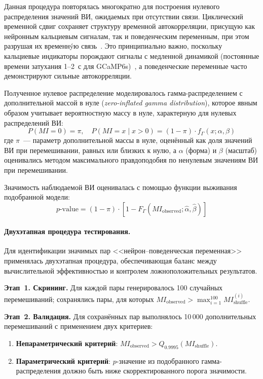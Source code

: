 Данная процедура повторялась многократно для построения нулевого распределения значений ВИ, ожидаемых при отсутствии связи. Циклический временной сдвиг сохраняет структуру временной автокорреляции, присущую как нейронным кальциевым сигналам, так и поведенческим переменным, при этом разрушая их временнýю связь~\cite{Lancaster2018}. Это принципиально важно, поскольку кальциевые индикаторы порождают сигналы с медленной динамикой (постоянные времени затухания 1--2~с для GCaMP6s)~\cite{Chen2013}, а поведенческие переменные часто демонстрируют сильные автокорреляции.

Полученное нулевое распределение моделировалось гамма-распределением с дополнительной массой в нуле (\textit{zero-inflated gamma distribution}), которое явным образом учитывает вероятностную массу в нуле, характерную для нулевых распределений ВИ:
$$P(MI = 0) = \pi, \quad P(MI = x \mid x > 0) = (1 - \pi) \cdot f_\Gamma(x; \alpha, \beta)$$
где $\pi$~--- параметр дополнительной массы в нуле, оценённый как доля значений ВИ при перемешивании, равных или близких к нулю, а $\alpha$ (форма) и $\beta$ (масштаб) оценивались методом максимального правдоподобия по ненулевым значениям ВИ при перемешивании.

Значимость наблюдаемой ВИ оценивалась с помощью функции выживания подобранной модели:
$$p\text{-value} = (1 - \pi) \cdot [1 - F_\Gamma(MI_{\text{observed}}; \hat{\alpha}, \hat{\beta})]$$

\paragraph{Двухэтапная процедура тестирования.}

Для идентификации значимых пар <<нейрон--поведенческая переменная>> применялась двухэтапная процедура, обеспечивающая баланс между вычислительной эффективностью и контролем ложноположительных результатов.

\textbf{Этап~1. Скрининг.} Для каждой пары генерировалось 100 случайных перемешиваний; сохранялись пары, для которых $MI_{\text{observed}} > \max_{i=1}^{100} MI_{\text{shuffle}}^{(i)}$.

\textbf{Этап~2. Валидация.} Для сохранённых пар выполнялось 10\,000 дополнительных перемешиваний с применением двух критериев:
\begin{enumerate}
    \item \textbf{Непараметрический критерий}: $MI_{\text{observed}} > Q_{0.9995}(MI_{\text{shuffle}})$.
    \item \textbf{Параметрический критерий}: $p$-значение из подобранного гамма-распределения должно быть ниже скорректированного порога значимости.
\end{enumerate}

